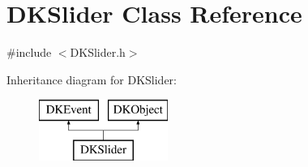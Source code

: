 \hypertarget{class_d_k_slider}{\section{D\-K\-Slider Class Reference}
\label{class_d_k_slider}
}


{\ttfamily \#include $<$D\-K\-Slider.\-h$>$}

Inheritance diagram for D\-K\-Slider\-:\begin{figure}[H]
\begin{center}
\leavevmode
\includegraphics[height=2.000000cm]{class_d_k_slider}
\end{center}
\end{figure}
